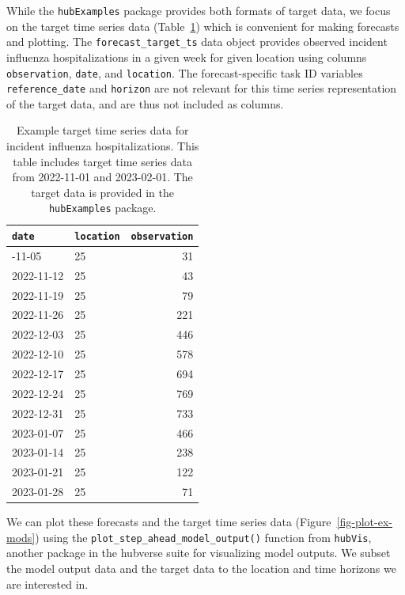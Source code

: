 \documentclass[
  letterpaper,
  DIV=11,
  numbers=noendperiod]{scrartcl}
\begin{document}
While the \texttt{hubExamples} package provides both formats of target
data, we focus on the target time series data
(Table~\ref{tbl-example-target-time-series-data}) which is convenient
for making forecasts and plotting. The \texttt{forecast\_target\_ts}
data object provides observed incident influenza hospitalizations in a
given week for given location using columns \texttt{observation},
\texttt{date}, and \texttt{location}. The forecast-specific task ID
variables \texttt{reference\_date} and \texttt{horizon} are not relevant
for this time series representation of the target data, and are thus not
included as columns.

\begin{longtable}[]{@{}llr@{}}

\caption{\label{tbl-example-target-time-series-data}Example target time
series data for incident influenza hospitalizations. This table includes
target time series data from 2022-11-01 and 2023-02-01. The target data
is provided in the \texttt{hubExamples} package.}

\tabularnewline

\toprule\noalign{}
\texttt{date} & \texttt{location} & \texttt{observation} \\
\midrule\noalign{}
\endhead
\bottomrule\noalign{}
\endlastfoot
2022-11-05 & 25 & 31 \\
2022-11-12 & 25 & 43 \\
2022-11-19 & 25 & 79 \\
2022-11-26 & 25 & 221 \\
2022-12-03 & 25 & 446 \\
2022-12-10 & 25 & 578 \\
2022-12-17 & 25 & 694 \\
2022-12-24 & 25 & 769 \\
2022-12-31 & 25 & 733 \\
2023-01-07 & 25 & 466 \\
2023-01-14 & 25 & 238 \\
2023-01-21 & 25 & 122 \\
2023-01-28 & 25 & 71 \\

\end{longtable}

We can plot these forecasts and the target time series data
(Figure~\ref{fig-plot-ex-mods}) using the
\texttt{plot\_step\_ahead\_model\_output()} function from
\texttt{hubVis}, another package in the hubverse suite for visualizing
model outputs. We subset the model output data and the target data to
the location and time horizons we are interested in.
\end{document}
